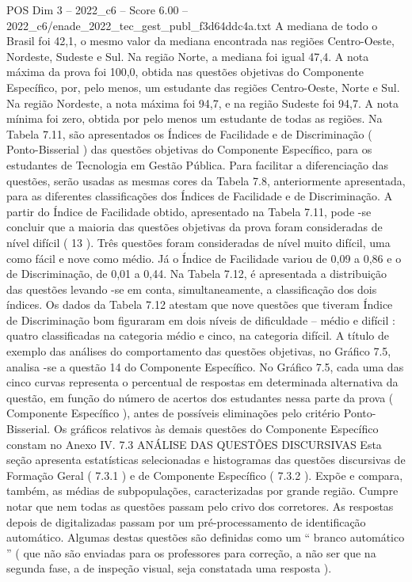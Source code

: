 \begin{textsample}{POS Dim 3 – 2022\_c6 – Score 6.00 – 2022\_c6/enade\_2022\_tec\_gest\_publ\_f3d64ddc4a.txt}
A mediana de todo o Brasil foi 42,1, o mesmo valor da mediana encontrada nas regiões Centro-Oeste, Nordeste, Sudeste e Sul.
Na região Norte, a mediana foi igual 47,4.
A nota máxima da prova foi 100,0, obtida nas questões objetivas do Componente Específico, por, pelo menos, um estudante das regiões Centro-Oeste, Norte e Sul.
Na região Nordeste, a nota máxima foi 94,7, e na região Sudeste foi 94,7.
A nota mínima foi zero, obtida por pelo menos um estudante de todas as regiões.
Na Tabela 7.11, são apresentados os Índices de Facilidade e de Discriminação ( Ponto-Bisserial ) das questões objetivas do Componente Específico, para os estudantes de Tecnologia em Gestão Pública.
Para facilitar a diferenciação das questões, serão usadas as mesmas cores da Tabela 7.8, anteriormente apresentada, para as diferentes classificações dos Índices de Facilidade e de Discriminação.
A partir do Índice de Facilidade obtido, apresentado na Tabela 7.11, pode -se concluir que a maioria das questões objetivas da prova foram consideradas de nível difícil ( 13 ).
Três questões foram consideradas de nível muito difícil, uma como fácil e nove como médio.
Já o Índice de Facilidade variou de 0,09 a 0,86 e o de Discriminação, de 0,01 a 0,44.
Na Tabela 7.12, é apresentada a distribuição das questões levando -se em conta, simultaneamente, a classificação dos dois índices.
Os dados da Tabela 7.12 atestam que nove questões que tiveram Índice de Discriminação bom figuraram em dois níveis de dificuldade – médio e difícil : quatro classificadas na categoria médio e cinco, na categoria difícil.
A título de exemplo das análises do comportamento das questões objetivas, no Gráfico 7.5, analisa -se a questão 14 do Componente Específico.
No Gráfico 7.5, cada uma das cinco curvas representa o percentual de respostas em determinada alternativa da questão, em função do número de acertos dos estudantes nessa parte da prova ( Componente Específico ), antes de possíveis eliminações pelo critério Ponto-Bisserial.
Os gráficos relativos às demais questões do Componente Específico constam no Anexo IV. 7.3 ANÁLISE DAS QUESTÕES DISCURSIVAS Esta seção apresenta estatísticas selecionadas e histogramas das questões discursivas de Formação Geral ( 7.3.1 ) e de Componente Específico ( 7.3.2 ).
Expõe e compara, também, as médias de subpopulações, caracterizadas por grande região.
Cumpre notar que nem todas as questões passam pelo crivo dos corretores.
As respostas depois de digitalizadas passam por um pré-processamento de identificação automático.
Algumas destas questões são definidas como um “ branco automático ” ( que não são enviadas para os professores para correção, a não ser que na segunda fase, a de inspeção visual, seja constatada uma resposta ).

\end{textsample}
